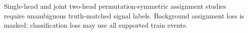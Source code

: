 Single-head and joint two-head permutation-symmetric assignment studies require unambiguous truth-matched signal labels. Background assignment loss is masked; classification loss may use all supported train events.
